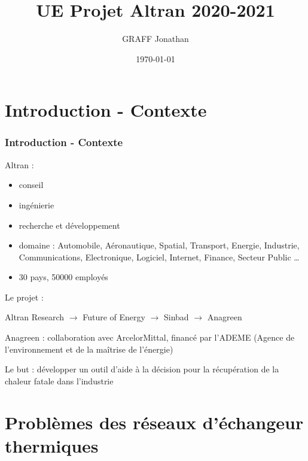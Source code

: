 \documentclass{beamer}
\title{UE Projet Altran 2020-2021}
\author{GRAFF Jonathan}
\date{\today}
\begin{document}
\maketitle
\tableofcontents
\section{Introduction - Contexte } 
\begin{frame}
\frametitle{Introduction - Contexte}
Altran : \begin{itemize}
\item conseil
\item ingénierie
\item recherche et développement
\pause
\item domaine : Automobile, Aéronautique, Spatial, Transport, Energie, Industrie, Communications, Electronique, Logiciel, Internet, Finance, Secteur Public \dots
\pause
\item 30 pays, 50000 employés
\end{itemize}
\end{frame}

\begin{frame}
Le projet : 

Altran Research \pause$\rightarrow$ Future of Energy \pause $\rightarrow$  Sinbad \pause $\rightarrow$ Anagreen\medskip

Anagreen : collaboration avec ArcelorMittal, financé par l'ADEME (Agence de l'environnement et de la maîtrise de l'énergie)\medskip

Le but : développer un outil d'aide à la décision pour la récupération de la chaleur fatale dans l'industrie
\end{frame}
\section{Problèmes des réseaux d'échangeur thermiques}
\end{document}
